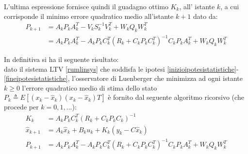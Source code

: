 \noindent L'ultima espressione fornisce quindi il guadagno ottimo $K_k$, all' istante $k$, a cui corrisponde il minimo errore quadratico medio all'istante $k+1$ dato da:
\begin{equation}
\begin{split}
P_{k+1}&=A_kP_kA_k^T-V_kS^{-1}_kV^T_k+W_kQ_kW_k^T\\ 
&=A_kP_kA_k^T-A_kP_kC_k^T(R_k+C_kP_kC_k^T)^{-1}C_kP_kA_k^T+W_kQ_kW_k^T
\end{split}
\end{equation}

\noindent In definitiva si ha il seguente risultato: \\
dato il sistema LTV \eqref{rumlinsys} che soddisfa le ipotesi \eqref{inizioipotesistatistiche}-\eqref{fineipotesistatistiche}, l'osservatore di Luenberger che minimizza ad ogni istante $k \geq 0$ l'errore quadratico medio di stima dello stato $P_k \triangleq E [(x_k - \hat{x}_k) (x_k - \hat{x}_k)T ]$ è fornito dal seguente algoritmo ricorsivo (che procede per $k = 0,1,...$):
\begin{align}
\label{luenb1}
K_k &= A_kP_kC_k^T(R_k+C_kP_kC_k)^{-1} \\
\label{luenb2}
\hat{x}_{k+1} &= A_k\hat{x}_k+B_ku_k+K_k(y_k-C\hat{x}_k)\\
\label{luenb3}
P_{k+1}&=A_kP_kA_k^T-A_kP_kC_k^T(R_k+C_kP_kC_k^T)^{-1}C_kP_kA_k^T+W_kQ_kW_k^T
\end{align}
\newpage